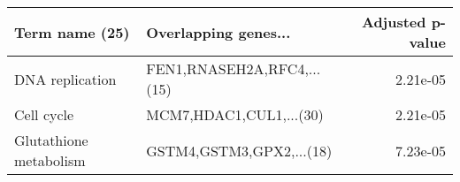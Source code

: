 \begin{tabular}{llr}
\toprule
        Term name (25) &       Overlapping genes... &  Adjusted p-value \\
\midrule
       DNA replication & FEN1,RNASEH2A,RFC4,...(15) &          2.21e-05 \\
            Cell cycle &    MCM7,HDAC1,CUL1,...(30) &          2.21e-05 \\
Glutathione metabolism &   GSTM4,GSTM3,GPX2,...(18) &          7.23e-05 \\
\bottomrule
\end{tabular}
